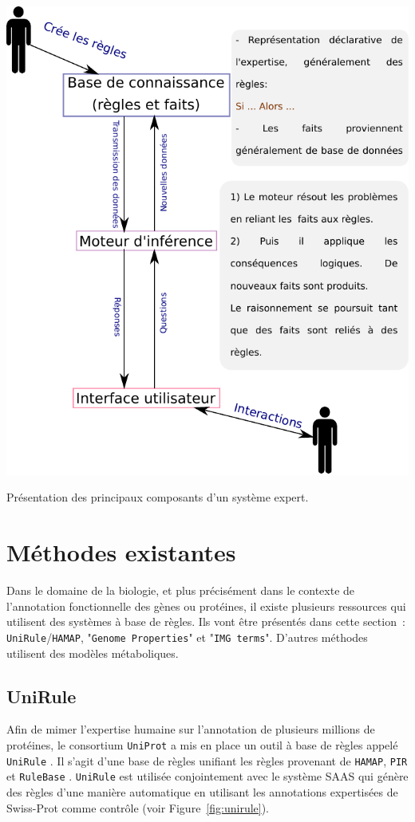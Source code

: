\begin{refsegment}
    \begin{shadedfigure}[H]
        \centering
        \includegraphics[width=\textwidth]{img/systeme_expert.pdf}
        \caption{Présentation des principaux composants d'un système expert.}
        \label{fig:systeme_expert}
    \end{shadedfigure}
    
    \section{Méthodes existantes}
    
    Dans le domaine de la biologie, et plus précisément dans le contexte de l’annotation fonctionnelle des gènes ou protéines, il existe plusieurs ressources qui utilisent des systèmes à base de règles. Ils vont être présentés dans cette section : \texttt{UniRule}/\texttt{HAMAP}, "\texttt{Genome Properties}" et "\texttt{IMG terms}". D’autres méthodes utilisent des modèles métaboliques.
    
    \subsection{UniRule}
    Afin de mimer l'expertise humaine sur l'annotation de plusieurs millions de protéines, le consortium \texttt{UniProt} a mis en place un outil à base de règles appelé \texttt{UniRule} \cite{unirule2015,bridge2010unirule}. Il s'agit d'une base de règles unifiant les règles provenant de \texttt{\gls{HAMAP}}, \texttt{\gls{PIR}} et \texttt{RuleBase} . \texttt{UniRule} est utilisée conjointement avec le système \gls{SAAS} \cite{kretschmann2001automatic,uniprot2015}  qui génère des règles d’une manière automatique en utilisant les annotations expertisées de Swiss-Prot comme contrôle (voir Figure~\cref{fig:unirule}).
    

\end{refsegment}
